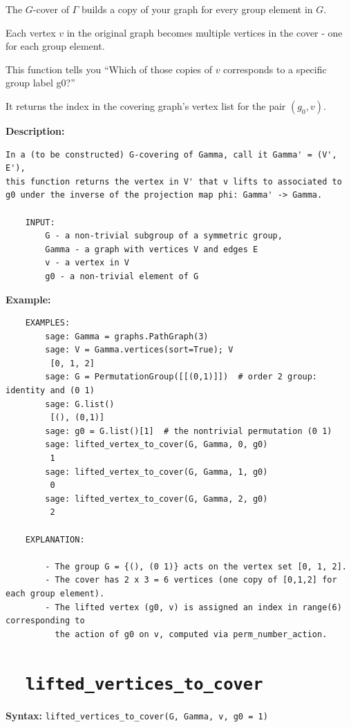 \documentclass{article}
\begin{document}
The $G$-cover of $\Gamma$ builds a copy of your graph for every group element in $G$.

Each vertex $v$ in the original graph becomes multiple vertices in the cover - one for each group element.

This function tells you ``Which of those copies of $v$ corresponds to a specific group label g0?''

It returns the index in the covering graph’s vertex list for the pair 
$(g_0, v)$.

\textbf{Description:}
\begin{verbatim}
In a (to be constructed) G-covering of Gamma, call it Gamma' = (V', E'), 
this function returns the vertex in V' that v lifts to associated to
g0 under the inverse of the projection map phi: Gamma' -> Gamma.

    INPUT:
        G - a non-trivial subgroup of a symmetric group,
        Gamma - a graph with vertices V and edges E
        v - a vertex in V
        g0 - a non-trivial element of G

\end{verbatim}

\textbf{Example:}
\begin{verbatim}
    EXAMPLES:
        sage: Gamma = graphs.PathGraph(3)
        sage: V = Gamma.vertices(sort=True); V
         [0, 1, 2]
        sage: G = PermutationGroup([[(0,1)]])  # order 2 group: identity and (0 1)
        sage: G.list()
         [(), (0,1)]
        sage: g0 = G.list()[1]  # the nontrivial permutation (0 1)
        sage: lifted_vertex_to_cover(G, Gamma, 0, g0)
         1
        sage: lifted_vertex_to_cover(G, Gamma, 1, g0)
         0
        sage: lifted_vertex_to_cover(G, Gamma, 2, g0)
         2

    EXPLANATION:

        - The group G = {(), (0 1)} acts on the vertex set [0, 1, 2].
        - The cover has 2 x 3 = 6 vertices (one copy of [0,1,2] for each group element).
        - The lifted vertex (g0, v) is assigned an index in range(6) corresponding to 
          the action of g0 on v, computed via perm_number_action.
\end{verbatim}

\section{\tt \ \ lifted\_vertices\_to\_cover}

\textbf{Syntax:} \verb}lifted_vertices_to_cover(G, Gamma, v, g0 = 1)}\\
\end{document}
